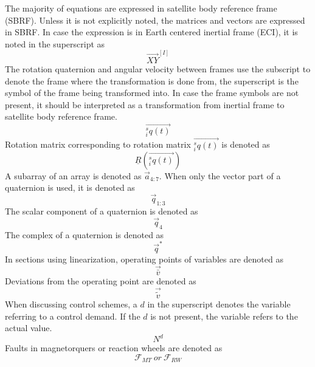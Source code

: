 The majority of equations are expressed in satellite body reference frame (SBRF). Unless it is not explicitly noted, the matrices and vectors are expressed in SBRF. In case the expression is in Earth centered inertial frame (ECI), it is noted in the superscript as 
\begin{equation*}
\vec{XY}^{[I]}
\end{equation*}
The rotation quaternion and angular velocity between frames use the subscript to denote the frame where the transformation is done from, the superscript is the symbol of the frame being transformed into. In case the frame symbols are not present, it should be interpreted as a transformation from inertial frame to satellite body reference frame.
\begin{equation*}
\vec{^s_i q(t)}
\end{equation*}
Rotation matrix corresponding to rotation matrix $\vec{^s_i q(t)}$ is denoted as
\begin{equation*}
\underline{R}(\vec{^s_i q(t)})
\end{equation*}
A subarray of an array is denoted as $\vec{a}_{4:7}$. When only the vector part of a quaternion is used, it is denoted as 
\begin{equation*}
\vec{q}_{1:3}
\end{equation*}
The scalar component of a quaternion is denoted as 
\begin{equation*}
\vec{q}_{4}
\end{equation*}
The complex of a quaternion is denoted as
\begin{equation*}
\vec q^\ast
\end{equation*}
In sections using linearization, operating points of variables are denoted as
\begin{equation*}
\vec{\bar{v}}
\end{equation*}
Deviations from the operating point are denoted as
\begin{equation*}
\vec{\tilde{v}}
\end{equation*}
When discussing control schemes, a $d$ in the superscript denotes the variable referring to a control demand. If the $d$ is not present, the variable refers to the actual value.
\begin{equation*}
N^d
\end{equation*}
Faults in magnetorquers or reaction wheels are denoted as
\begin{equation*}
\mathcal{F}_{MT} \ or  \  \mathcal{F}_{RW}
\end{equation*}

